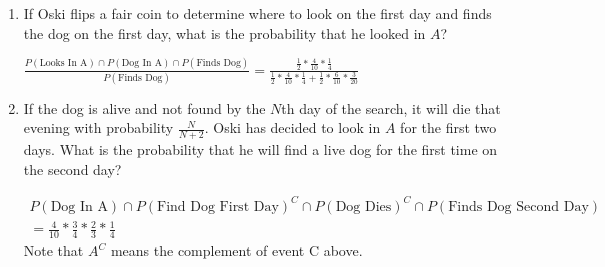 \begin{enumerate}[label=(\alph*)]
\item If Oski flips a fair coin to determine where to look on the first 
day and finds the dog on the first day, what is the probability that he 
looked in $A$?
\begin{solution}[3cm]
$\frac{P(\text{Looks In A}) \cap P(\text{Dog In A}) \cap 
P(\text{Finds Dog})}{P(\text{Finds Dog})} 
= \frac{\frac{1}{2} * \frac{4}{10} * \frac{1}{4}}{\frac{1}{2} * 
\frac{4}{10} * \frac{1}{4} + \frac{1}{2} * \frac{6}{10} * \frac{3}{20}}$
\end{solution}
                        
\item  If the dog is alive and not found by the $N$th day of the search, 
it will die that evening with probability $\frac{N}{N+2}$. Oski has 
decided to look in $A$ for the first two days. What is the probability 
that he will find a live dog for the first time on the second day? 
\begin{solution}[2cm]
\begin{multline}
P(\text{Dog In A}) \cap P(\text{Find Dog First Day})^{C} \cap \nonumber
P(\text{Dog Dies})^{C} \cap 
P(\text{Finds Dog Second Day}) \\
= \frac{4}{10} * \frac{3}{4} * \frac{2}{3} * \frac{1}{4}
\end{multline}
Note that $A^{C}$ means the complement of event C above.
\end{solution}
\end{enumerate}